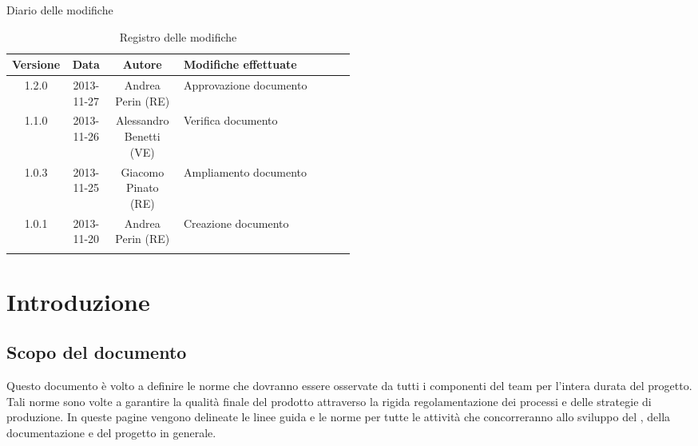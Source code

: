 
\newpage
Diario delle modifiche
\begin{center}
\begin{longtable}{|c|c|c|p{0.5\linewidth}|}
\toprule
\textbf{Versione} & \textbf{Data} & \textbf{Autore} & \textbf{Modifiche effettuate}\\


\midrule
1.2.0 & 2013-11-27 & Andrea Perin (RE) & Approvazione documento\\
\midrule
1.1.0 & 2013-11-26 & Alessandro Benetti (VE) & Verifica documento\\
\midrule
1.0.3 & 2013-11-25 & Giacomo Pinato (RE) & Ampliamento documento\\
\midrule
1.0.1 & 2013-11-20 & Andrea Perin (RE) & Creazione documento\\

\bottomrule
\caption{Registro delle modifiche}
\label{tab:changelog}
\end{longtable}
\end{center}

\newpage
\tableofcontents


\newpage
\section{Introduzione}%
\label{1.0}
\subsection{Scopo del documento}%
\label{1.1}
Questo documento è volto a definire le norme che dovranno essere osservate da tutti i componenti del team per l'intera durata del progetto. Tali norme sono volte a garantire la qualità finale del prodotto attraverso la rigida regolamentazione dei processi e delle strategie di produzione. In queste pagine vengono delineate le linee guida e le norme per tutte le attività che concorreranno allo sviluppo del , della documentazione e del progetto in generale.

